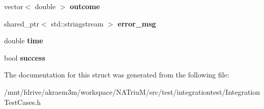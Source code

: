 \begin{DoxyCompactItemize}
\item 
\hypertarget{structnatrium_1_1IntegrationTestCases_1_1TestResult_ac38f2c7a01b0e0501cadf4775bc26572}{
vector$<$ double $>$ {\bfseries outcome}}
\label{structnatrium_1_1IntegrationTestCases_1_1TestResult_ac38f2c7a01b0e0501cadf4775bc26572}

\item 
\hypertarget{structnatrium_1_1IntegrationTestCases_1_1TestResult_aac009d7342e7af46b75432b4f43b0226}{
shared\_\-ptr$<$ std::stringstream $>$ {\bfseries error\_\-msg}}
\label{structnatrium_1_1IntegrationTestCases_1_1TestResult_aac009d7342e7af46b75432b4f43b0226}

\item 
\hypertarget{structnatrium_1_1IntegrationTestCases_1_1TestResult_af8b68ac3c5257163877d52c06d599424}{
double {\bfseries time}}
\label{structnatrium_1_1IntegrationTestCases_1_1TestResult_af8b68ac3c5257163877d52c06d599424}

\item 
\hypertarget{structnatrium_1_1IntegrationTestCases_1_1TestResult_abfd745aedfa8bfb6c6f2d93f61294954}{
bool {\bfseries success}}
\label{structnatrium_1_1IntegrationTestCases_1_1TestResult_abfd745aedfa8bfb6c6f2d93f61294954}

\end{DoxyCompactItemize}


The documentation for this struct was generated from the following file:\begin{DoxyCompactItemize}
\item 
/mnt/fdrive/akraem3m/workspace/NATriuM/src/test/integrationtest/IntegrationTestCases.h\end{DoxyCompactItemize}
